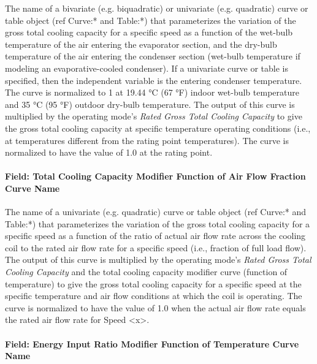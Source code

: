 The name of a bivariate (e.g. biquadratic) or univariate (e.g. quadratic) curve or table object (ref Curve:* and Table:*) that parameterizes the variation of the gross total cooling capacity for a specific speed as a function of the wet-bulb temperature of the air entering the evaporator section, and the dry-bulb temperature of the air entering the condenser section (wet-bulb temperature if modeling an evaporative-cooled condenser). If a univariate curve or table is specified, then the independent variable is the entering condenser temperature. The curve is normalized to 1 at 19.44 °C (67 °F) indoor wet-bulb temperature and 35 °C (95 °F) outdoor dry-bulb temperature. The output of this curve is multiplied by the operating mode's \textit{Rated Gross Total Cooling Capacity} to give the gross total cooling capacity at specific temperature operating conditions (i.e., at temperatures different from the rating point temperatures). The curve is normalized to have the value of 1.0 at the rating point.

\paragraph{Field: Total Cooling Capacity Modifier Function of Air Flow Fraction Curve Name}\label{field-total-cooling-capacity-function-of-air-flow-fraction-curve-name}

The name of a univariate (e.g. quadratic) curve or table object (ref Curve:* and Table:*) that parameterizes the variation of the gross total cooling capacity for a specific speed as a function of the ratio of actual air flow rate across the cooling coil to the rated air flow rate for a specific speed (i.e., fraction of full load flow). The output of this curve is multiplied by the operating mode's \textit{Rated Gross Total Cooling Capacity} and the total cooling capacity modifier curve (function of temperature) to give the gross total cooling capacity for a specific speed at the specific temperature and air flow conditions at which the coil is operating. The curve is normalized to have the value of 1.0 when the actual air flow rate equals the rated air flow rate for Speed \textless{}x\textgreater{}.

\paragraph{Field: Energy Input Ratio Modifier Function of Temperature Curve Name}\label{field-energy-input-ratio-function-of-temperature-curve-name}

